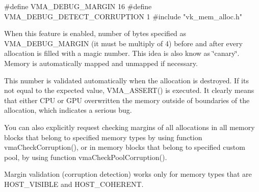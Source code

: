 \begin{DoxyCode}
\textcolor{preprocessor}{#define VMA\_DEBUG\_MARGIN 16}
\textcolor{preprocessor}{#define VMA\_DEBUG\_DETECT\_CORRUPTION 1}
\textcolor{preprocessor}{#include "vk\_mem\_alloc.h"}
\end{DoxyCode}


When this feature is enabled, number of bytes specified as {\ttfamily V\+M\+A\+\_\+\+D\+E\+B\+U\+G\+\_\+\+M\+A\+R\+G\+IN} (it must be multiply of 4) before and after every allocation is filled with a magic number. This idea is also know as \char`\"{}canary\char`\"{}. Memory is automatically mapped and unmapped if necessary.

This number is validated automatically when the allocation is destroyed. If it\textquotesingle{}s not equal to the expected value, {\ttfamily V\+M\+A\+\_\+\+A\+S\+S\+E\+R\+T()} is executed. It clearly means that either C\+PU or G\+PU overwritten the memory outside of boundaries of the allocation, which indicates a serious bug.

You can also explicitly request checking margins of all allocations in all memory blocks that belong to specified memory types by using function vma\+Check\+Corruption(), or in memory blocks that belong to specified custom pool, by using function vma\+Check\+Pool\+Corruption().

Margin validation (corruption detection) works only for memory types that are {\ttfamily H\+O\+S\+T\+\_\+\+V\+I\+S\+I\+B\+LE} and {\ttfamily H\+O\+S\+T\+\_\+\+C\+O\+H\+E\+R\+E\+NT}. 